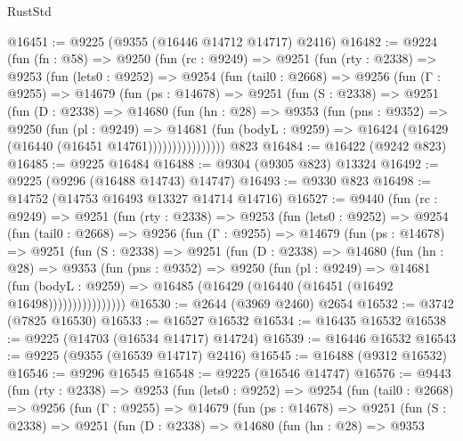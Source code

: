 \begin{lexlean}{RustStd}
\begin{coremodule}
@16451 := @9225 (@9355 (@16446 @14712 @14717) @2416)
@16482 := @9224
    (fun (fn : @58) =>
    @9250
      (fun (rc : @9249) =>
      @9251
        (fun (rty : @2338) =>
        @9253
          (fun (lets0 : @9252) =>
          @9254
            (fun (tail0 : @2668) =>
            @9256
              (fun (Γ : @9255) =>
              @14679
                (fun (ps : @14678) =>
                @9251
                  (fun (S : @2338) =>
                  @9251
                    (fun (D : @2338) =>
                    @14680
                      (fun (hn : @28) =>
                      @9353
                        (fun (pns : @9352) =>
                        @9250
                          (fun (pl : @9249) =>
                          @14681
                            (fun (bodyL : @9259) =>
                            @16424 (@16429 (@16440 (@16451 @14761))))))))))))))))
    @823
@16484 := @16422 (@9242 @823)
@16485 := @9225 @16484
@16488 := @9304 (@9305 @823) @13324
@16492 := @9225 (@9296 (@16488 @14743) @14747)
@16493 := @9330 @823
@16498 := @14752 (@14753 @16493 @13327 @14714 @14716)
@16527 := @9440
    (fun (rc : @9249) =>
    @9251
      (fun (rty : @2338) =>
      @9253
        (fun (lets0 : @9252) =>
        @9254
          (fun (tail0 : @2668) =>
          @9256
            (fun (Γ : @9255) =>
            @14679
              (fun (ps : @14678) =>
              @9251
                (fun (S : @2338) =>
                @9251
                  (fun (D : @2338) =>
                  @14680
                    (fun (hn : @28) =>
                    @9353
                      (fun (pns : @9352) =>
                      @9250
                        (fun (pl : @9249) =>
                        @14681
                          (fun (bodyL : @9259) =>
                          @16485 (@16429 (@16440 (@16451 (@16492 @16498))))))))))))))))
@16530 := @2644 (@3969 @2460) @2654
@16532 := @3742 (@7825 @16530)
@16533 := @16527 @16532
@16534 := @16435 @16532
@16538 := @9225 (@14703 (@16534 @14717) @14724)
@16539 := @16446 @16532
@16543 := @9225 (@9355 (@16539 @14717) @2416)
@16545 := @16488 (@9312 @16532)
@16546 := @9296 @16545
@16548 := @9225 (@16546 @14747)
@16576 := @9443
    (fun (rty : @2338) =>
    @9253
      (fun (lets0 : @9252) =>
      @9254
        (fun (tail0 : @2668) =>
        @9256
          (fun (Γ : @9255) =>
          @14679
            (fun (ps : @14678) =>
            @9251
              (fun (S : @2338) =>
              @9251
                (fun (D : @2338) =>
                @14680
                  (fun (hn : @28) =>
                  @9353

\end{coremodule}
\end{lexlean}
